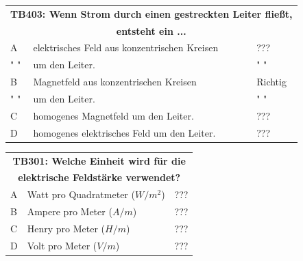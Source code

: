 \begin{frame}
	\begin{center}
	\begin{small}
	\begin{tabular}{|l|l|l|}
		\hline
		\multicolumn{3}{|c|}{\textbf{TB403: Wenn Strom durch einen gestreckten Leiter fließt,}}\\
		\multicolumn{3}{|c|}{\textbf{entsteht ein ...}}\\
		\hline
		A & elektrisches Feld aus konzentrischen Kreisen & ??? \\ 
		" " & um den Leiter. & " " \\ \hline
		B & Magnetfeld aus konzentrischen Kreisen        & Richtig \\ 
		" " & um den Leiter. & " " \\ \hline
		C & homogenes Magnetfeld um den Leiter.          & ??? \\ \hline
		D & homogenes elektrisches Feld um den Leiter.   & ??? \\ \hline
	\end{tabular}
	\end{small}		
	\end{center}
\end{frame}

\begin{frame}
	\begin{center}
	\begin{tabular}{|l|l|l|}
		\hline
		\multicolumn{3}{|c|}{\textbf{TB301: Welche Einheit wird für die}}\\
		\multicolumn{3}{|c|}{\textbf{elektrische Feldstärke verwendet?}}\\
		\hline
		A & Watt pro Quadratmeter ($W/m^2$) & ??? \\ \hline
		B & Ampere pro Meter ($A/m$)        & ??? \\ \hline
		C & Henry pro Meter ($H/m$)         & ??? \\ \hline
		D & Volt pro Meter ($V/m$)          & ??? \\ \hline
	\end{tabular}
	\end{center}
\end{frame}


